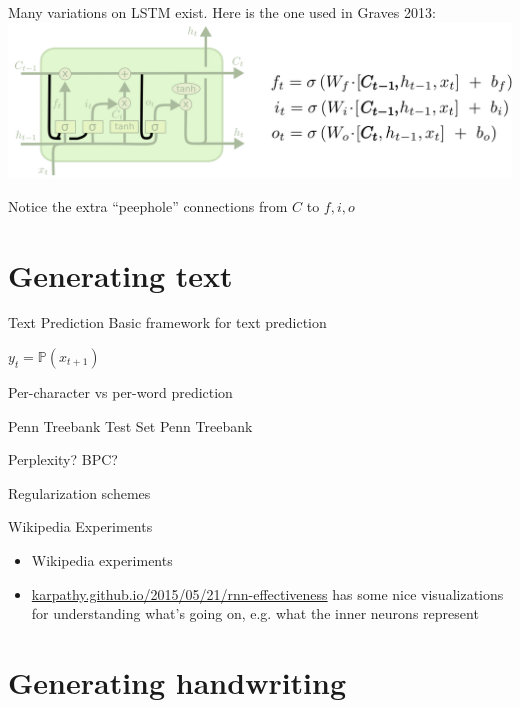 \documentclass[10pt,xcolor=dvipsnames]{beamer}
\def\bbP{\mathbb{P}}
\begin{document}
\begin{frame}{}
  Many variations on LSTM exist. Here is the one used
  in Graves 2013:
  \includegraphics[width=\linewidth]{fig/LSTM3-var-peepholes.png}

  Notice the extra ``peephole'' connections from
  $C$ to $f, i, o$
\end{frame}


\section{Generating text}

\begin{frame}{Text Prediction}
  Basic framework for text prediction

  $y_t = \bbP(x_{t+1})$

  Per-character vs per-word prediction
\end{frame}

\begin{frame}{Penn Treebank Test Set}
  Penn Treebank

  Perplexity? BPC?

  Regularization schemes
\end{frame}

\begin{frame}{Wikipedia Experiments}
  \begin{itemize}
  \item   Wikipedia experiments
  \item \url{karpathy.github.io/2015/05/21/rnn-effectiveness} has some nice
    visualizations for understanding what's going on, e.g. what the inner
    neurons represent
  \end{itemize}
\end{frame}

\section{Generating handwriting}
\end{document}
